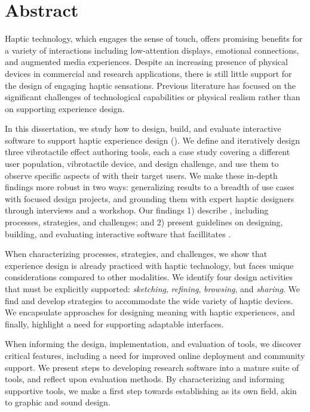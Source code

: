 
\chapter{Abstract}

Haptic technology, which engages the sense of touch, offers promising benefits for a variety of interactions including low-attention displays, emotional connections, and augmented media experiences.
Despite %
an increasing presence of physical devices in commercial and research applications, there is still little support for the design of engaging haptic sensations.
Previous literature has focused on the significant challenges of technological capabilities or physical realism rather than on supporting experience design. %

In this dissertation, we study how to design, build, and evaluate interactive software to support haptic experience design (\haxd).
We define \haxd and iteratively design three vibrotactile effect authoring tools, each a case study covering a different user population, vibrotactile device, and design challenge, and use them to observe specific aspects of \haxd with their target users.
We make these in-depth findings more robust in two ways: generalizing results to a breadth of use cases with focused design projects, and grounding them with expert haptic designers through interviews and a workshop.
Our findings 1) describe \haxd, including processes, strategies, and challenges; and 2) present guidelines on designing, building, and evaluating interactive software that facillitates \haxd.

When characterizing \haxd processes, strategies, and challenges, 
we show that experience design is already practiced with haptic technology, but faces unique considerations compared to other modalities. 
We identify four design activities that must be explicitly supported: \emph{sketching}, \emph{refining}, \emph{browsing}, and \emph{sharing}.
We find and develop strategies to accommodate the wide variety of haptic devices.
We encapsulate approaches for designing meaning with haptic experiences, and finally, highlight a need for supporting adaptable interfaces.

When informing the design, implementation, and evaluation of \haxd tools,
we discover critical features, including a need for improved online deployment and community support.
We present steps to developing research software into a mature \haxd suite of tools, and reflect upon evaluation methods.
%
By characterizing \haxd and informing supportive tools, we make a first step towards establishing \haxd as its own field, akin to graphic and sound design.

